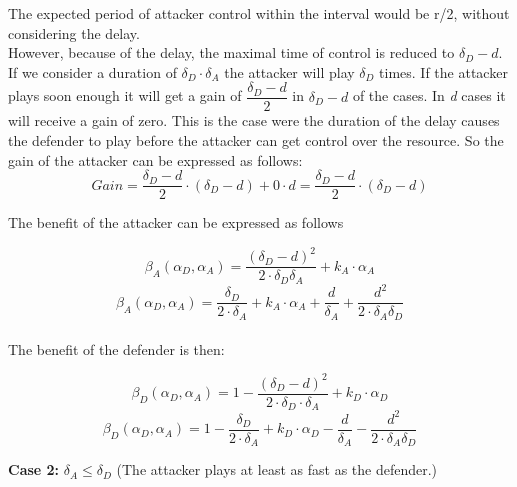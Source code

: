The expected period of attacker control within the interval would be r/2, without considering the delay. \\

However, because of the delay, the maximal time of control is reduced to $\delta_{D}-d$. If we consider a duration of $\delta_{D} \cdot \delta_{A}$ the attacker will play $\delta_{D}$ times. If the attacker plays soon enough it will get a gain of $\dfrac{\delta_{D}-d}{2}$ in $\delta_{D}-d$ of the cases. In \textit{d} cases it will receive a gain of zero. This is the case were the duration of the delay causes the defender to play before the attacker can get control over the resource. 
So the gain of the attacker can be expressed as follows:
\begin{equation}\label{first}
Gain =  \dfrac{\delta_{D}-d}{2} \cdot (\delta_{D}-d) + 0 \cdot d = \dfrac{\delta_{D}-d}{2} \cdot (\delta_{D}-d)
\end{equation}

The benefit of the attacker can be expressed as follows

\begin{equation}\label{first}
\beta_{A}(\alpha_{D},\alpha_{A}) = \dfrac { (\delta_{D}-d) ^{2}} {2 \cdot \delta_{D}  \delta_{A}} + k_{A} \cdot \alpha_{A}
\end{equation}
\begin{equation}\label{first}
\beta_{A}(\alpha_{D},\alpha_{A}) = \dfrac { \delta_{D}} {2 \cdot \delta_{A}} + k_{A} \cdot \alpha_{A} + \dfrac{d}{\delta_{A}} + \dfrac{d^{2}}{2 \cdot \delta_{A} \delta_{D}}
\end{equation}
\\

The benefit of the defender is then:

\begin{equation}\label{first}
\beta_{D}(\alpha_{D},\alpha_{A}) = 1 - \dfrac { (\delta_{D}-d) ^{2}} {2 \cdot \delta_{D} \cdot \delta_{A}} + k_{D} \cdot \alpha_{D}
\end{equation}
\begin{equation}\label{first}
\beta_{D}(\alpha_{D},\alpha_{A}) = 1 - \dfrac { \delta_{D}} {2 \cdot \delta_{A}} + k_{D} \cdot \alpha_{D} - \dfrac{d}{\delta_{A}}- \dfrac{d^{2}}{2 \cdot \delta_{A} \delta_{D}}
\end{equation}


\textbf{Case 2:} $\delta_{A} \leq \delta_{D} $ (The attacker plays at least as fast as the defender.) \\

